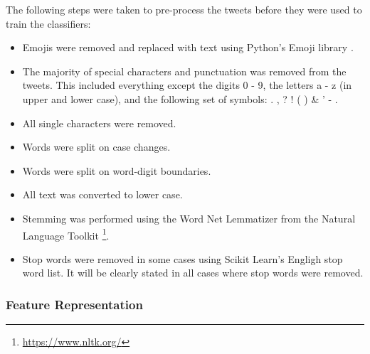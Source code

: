 The following steps were taken to pre-process the tweets before they were used to train the classifiers:
\begin{itemize}
    \item Emojis were removed and replaced with text using Python's Emoji library \cite{emoji}.
    \item The majority of special characters and punctuation was removed from the tweets. This included everything except the digits 0 - 9, the letters a - z (in upper and lower case), and the following set of symbols: . , ? ! ( ) \& ' - . 
    \item All single characters were removed.
    \item Words were split on case changes.
    \item Words were split on word-digit boundaries.
    \item All text was converted to lower case.
    \item Stemming was performed using the Word Net Lemmatizer from the Natural Language Toolkit \footnote{\url{https://www.nltk.org/}}.
    \item Stop words were removed in some cases using Scikit Learn's Engligh stop word list. It will be clearly stated in all cases where stop words were removed.
\end{itemize}

\subsubsection{Feature Representation}

